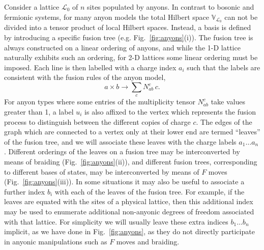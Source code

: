 \documentclass[aps,prb,reprint,superscriptaddress,amsfonts,amsmath,amssymb,showpacs,floatfix]{revtex4-1}
\newcommand{\mbb}[1]{\mathbb{#1}}
\newcommand{\mc}[1]{\mathcal{#1}}
\newcommand{\fref}[1]{Fig.~\ref{#1}}
\newcommand{\citestop}[1]{.\cite{#1}}
\begin{document}
Consider a lattice $\mc{L}_0$ of $n$ sites populated by anyons. In contrast to bosonic and fermionic systems, for many anyon models the total Hilbert space $\mbb{V}_{\mc{L}_0}$ can not be divided into a tensor product of local Hilbert spaces. Instead, a basis is defined by introducing a specific fusion tree (e.g. \fref{fig:anyons}(i)). The fusion tree is always constructed on a linear ordering of %
anyons, and while the {1-D} lattice naturally exhibits such an ordering, for 2-D lattices some linear ordering %
must be imposed.
Each line is then labelled with a charge index $a_i$ such that the labels are consistent with the fusion rules of the anyon model,
\begin{equation}
a\times b\rightarrow \sum_{c} N_{ab}^{c} \,c.\label{eq:fusion}
\end{equation}
For anyon types where some entries of the multiplicity tensor $N_{ab}^c$ take values greater than 1, a label $u_i$ is also affixed to the vertex which represents the fusion process to distinguish between the different copies of charge $c$.
The edges of the graph which are connected to a vertex only at their lower end are termed ``leaves'' of the fusion tree, and we will associate these leaves with the charge labels $a_1\ldots a_n$. Different orderings of the leaves on a fusion tree may be interconverted by means of braiding (\fref{fig:anyons}(ii)), and different fusion trees, corresponding to different bases of states, may be interconverted by means of $F$ moves (\fref{fig:anyons}(iii))\citestop{kitaev2006,bonderson2007}
In some situations it may also be useful to associate a further index $b_i$ %
with each of the leaves of the fusion tree. For example, if the leaves are equated with the sites of a physical lattice, then this additional index may be used to enumerate additional non-anyonic degrees of freedom associated with that lattice. %
For simplicity we will usually leave %
these extra indices $b_1\ldots b_n$ implicit, as we have done in \fref{fig:anyons}, 
as they do not directly participate in anyonic manipulations such as $F$ moves and braiding.
\end{document}
